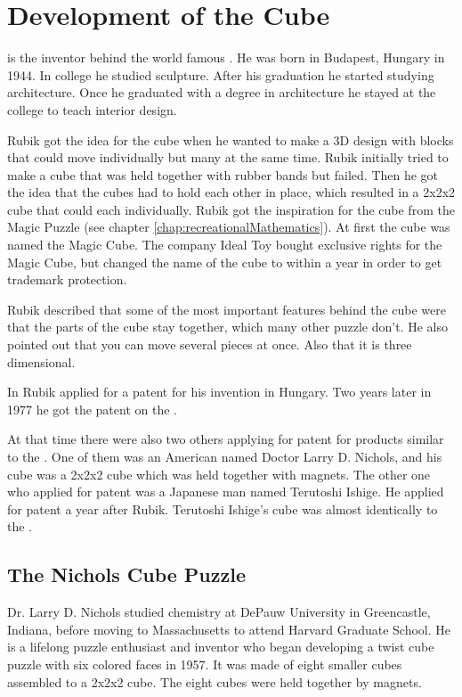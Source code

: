 \chapter{Development of the Cube}
\erno{} is the inventor behind the world famous \rubik{}. He was born in Budapest, Hungary in 1944.  In college he studied sculpture. After his graduation he started studying architecture.  Once he graduated with a degree in architecture he stayed at the college to teach interior design.

Rubik got the idea for the cube when he wanted to make a 3D design with blocks that could move individually but many at the same time. Rubik initially tried  to make a cube that was held together with rubber bands but failed. Then he got the idea that the cubes had to hold each other in place, which resulted in a 2x2x2 cube that could \twist{} each \face{} individually. Rubik got the inspiration for the cube from the Magic Puzzle (see chapter \ref{chap:recreationalMathematics}). At first the cube was named the Magic Cube. The company Ideal Toy bought exclusive rights for the Magic Cube, but changed the name of the cube to \rubik{} within a year in order to get trademark protection.

Rubik described that some of the most important features behind the cube were that the parts of the cube stay together, which many other puzzle don’t. He also pointed out that you can move several pieces at once. Also that it is three dimensional. 

In  Rubik applied for a patent for his invention in Hungary. Two years later in 1977 he got the patent on the \rubik{}.

At that time there were also two others applying for patent for products similar to the \rubik{}.  One of them was an American named Doctor Larry D. Nichols, and his cube was a 2x2x2 cube which was held together with magnets. The other one who applied for patent was a Japanese man named Terutoshi Ishige. He applied for patent a year after Rubik. Terutoshi Ishige's cube was almost identically to the \rubik{}. 
 
\section{The Nichols Cube Puzzle}
Dr. Larry D. Nichols studied chemistry at DePauw University in Greencastle, Indiana, before moving to Massachusetts to attend Harvard Graduate School. 
He is a lifelong puzzle enthusiast and inventor who  began developing a twist cube puzzle with six colored faces in 1957. It was made of eight smaller cubes assembled to a 2x2x2 cube. The eight cubes were held together by magnets.

